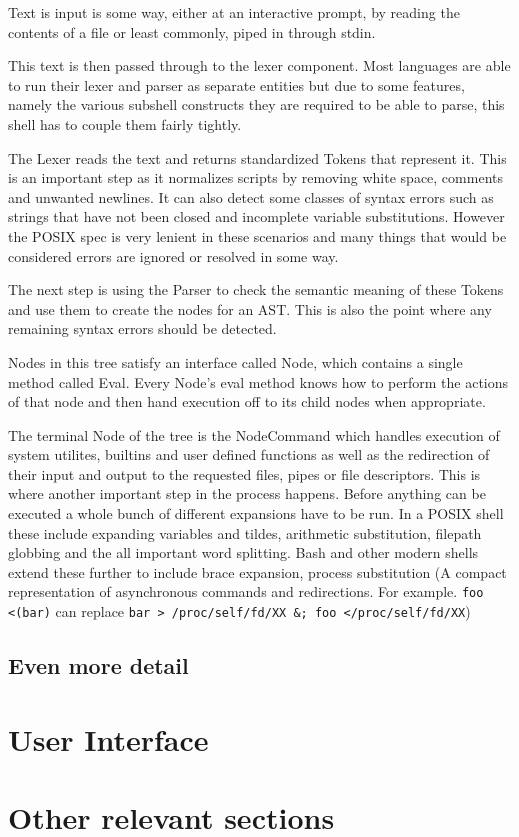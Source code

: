 Text is input is some way, either at an interactive prompt, by reading the contents of a file or least commonly, piped in through stdin.

This text is then passed through to the lexer component.
Most languages are able to run their lexer and parser as separate entities but due to some  features, namely the various subshell constructs they are required to be able to parse, this shell has to couple them fairly tightly.

The Lexer reads the text and returns standardized Tokens that represent it.
This is an important step as it normalizes scripts by removing white space, comments and unwanted newlines.
It can also detect some classes of syntax errors such as strings that have not been closed and incomplete variable substitutions.
However the POSIX spec is very lenient in these scenarios and many things that would be considered errors are ignored or resolved in some way. %

The next step is using the Parser to check the semantic meaning of these Tokens and use them to create the nodes for an AST.
This is also the point where any remaining syntax errors should be detected.

Nodes in this tree satisfy an interface called Node, which contains a single method called Eval.
Every Node's eval method knows how to perform the actions of that node and then hand execution off to its child nodes when appropriate.

The terminal Node of the tree is the NodeCommand which handles execution of system utilites, builtins and user defined functions as well as the redirection of their input and output to the requested files, pipes or file descriptors.
This is where another important step in the process happens.
Before anything can be executed a whole bunch of different expansions have to be run. In a POSIX shell these include expanding variables and tildes, arithmetic substitution, filepath globbing and the all important word splitting.
Bash and other modern shells extend these further to include brace expansion, process substitution (A compact representation of asynchronous commands and redirections. For example. \texttt{foo <(bar)} can replace \texttt{bar > /proc/self/fd/XX &; foo </proc/self/fd/XX})



\subsection{Even more detail}

\section{User Interface}

\section{Other relevant sections}